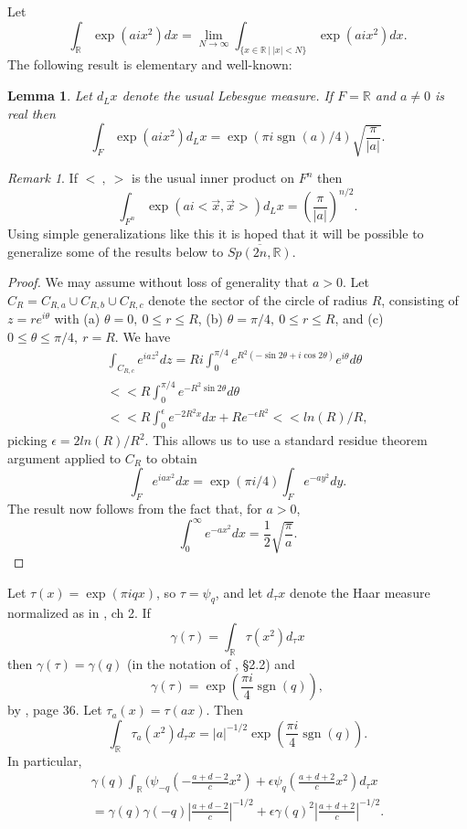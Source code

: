 \documentclass[12pt,letterpaper]{book}
\theoremstyle{plain}
\newtheorem{lemma}[theorem]{Lemma}
\theoremstyle{definition}
\theoremstyle{remark}
\newtheorem{remark}[theorem]{Remark}
\theoremstyle{remark}
\DeclareMathOperator{\sgn}{sgn}
\begin{document}
Let
\[
\int_{\mathbb{R}} \exp(aix^2)dx
=\lim_{N\rightarrow \infty}
\int_{\{x\in {\mathbb{R}}\ |\ |x|<N\}} \exp(aix^2)dx.
\]
The following result is elementary and well-known:

\begin{lemma}\label{lem:gauss} Let $d_Lx$ denote the usual Lebesgue measure.
If $F=\mathbb{R}$ and $a\not= 0$ is real then
\[
\int_{F} \exp(aix^2)d_Lx =\exp(\pi i \sgn(a)/4)\sqrt{\frac{\pi}{|a|}}.
\]
\end{lemma}

\begin{remark}
If $<\ ,\ >$ is the usual inner product on
$F^n$ then
\[
\int_{F^n} \exp(ai<\vec{x},\vec{x}>)d_L x =({\frac{\pi}{|a|}})^{n/2}.
\]
Using simple generalizations like this it is hoped that it will
be possible to generalize some of the results below to
$\overline{Sp(2n,{\mathbb{R}})}$.
\end{remark}

\begin{proof} We may assume without loss of generality that $a>0$.
Let $C_R=C_{R,a}\cup C_{R,b}\cup C_{R,c}$
denote the sector of the circle of radius $R$,
consisting of $z=re^{i\theta}$ with (a) $\theta=0,\ 0\leq r\leq R$,
(b) $\theta=\pi/4,\ 0\leq r\leq R$, and (c) $0\leq \theta \leq \pi/4,\ r=R$.
We have
\[
\begin{array}{c}
\int_{C_{R,c}} e^{iaz^2}dz=
Ri\int_0^{\pi/4} e^{R^2(-\sin 2\theta +i\cos 2\theta )}e^{i\theta} d\theta\\
<< R\int_0^{\pi/4} e^{-R^2\sin 2\theta }d\theta\\
<< R\int_0^{\epsilon} e^{-2R^2x}dx +Re^{-\epsilon R^2}
<<ln(R)/R,
\end{array}
\]
picking $\epsilon =2ln(R)/R^2$.
This allows us to use a standard residue theorem argument
applied to $C_R$ to obtain
\[
\int_F e^{iax^2}dx=\exp(\pi i/4)\int_F e^{-ay^2}dy.
\]
The result now follows from the fact that, for $a>0$,
\[
\int_0^\infty e^{-ax^2}dx={\frac{1}{2}}\sqrt{\frac{\pi}{a}}.
\]
\end{proof}

Let $\tau (x)=\exp (\pi i q x)$, so $\tau=\psi_q$,
and let $d_\tau x$ denote
the Haar measure normalized as in \cite{Ge2}, ch 2. If
\[
\gamma(\tau)=
\int_{\mathbb{R}} \tau(x^2)d_\tau x
\]
then $\gamma(\tau) =\gamma(q)$ (in the notation of \cite{Fl}, \S 2.2) and
\[
\gamma(\tau)=\exp ({\frac{\pi i}{4}} \sgn(q)),
\]
by \cite{Ge2}, page 36. Let $\tau_a(x)=\tau(ax)$. Then
\[
\int_{\mathbb{R}} \tau_a(x^2)d_\tau x
=|a|^{-1/2}\exp ({\frac{\pi i}{4}} \sgn(q)).
\]
In particular,
\[
\begin{array}{c}
\gamma(q)
\int_{\mathbb{R}}
(\psi_{-q}(-{\frac{a+d-2}{c}}x^2)+
\epsilon\psi_q({\frac{a+d+2}{c}}x^2)d_\tau x\\
=\gamma(q)\gamma(-q)|{\frac{a+d-2}{c}}|^{-1/2}+
\epsilon \gamma(q)^2|{\frac{a+d+2}{c}}|^{-1/2}.
\end{array}
\]
\end{document}
